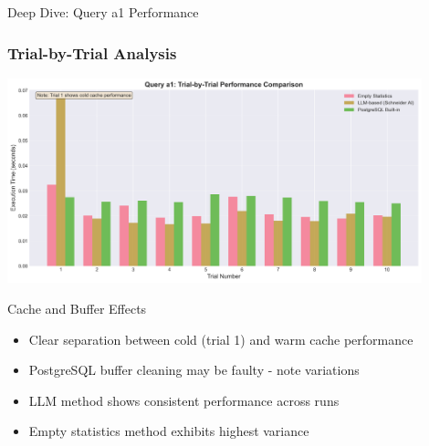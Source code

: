 \documentclass{beamer}
\begin{document}
\begin{frame}{Deep Dive: Query a1 Performance}
\frametitle{Trial-by-Trial Analysis}

\begin{center}
\includegraphics[width=0.9\textwidth]{images/a1_trial_comparison.png}
\end{center}

\begin{alertblock}{Cache and Buffer Effects}
\begin{itemize}
    \item Clear separation between cold (trial 1) and warm cache performance
    \item PostgreSQL buffer cleaning may be faulty - note variations
    \item LLM method shows consistent performance across runs
    \item Empty statistics method exhibits highest variance
\end{itemize}
\end{alertblock}

\end{frame}
\end{document}
